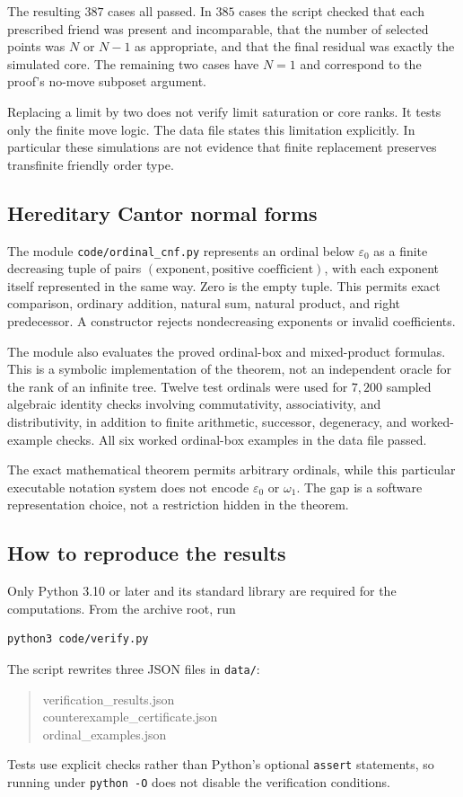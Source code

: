 \documentclass[11pt,letterpaper]{article}
\theoremstyle{definition}
\theoremstyle{remark}
\begin{document}
The resulting $387$ cases all passed. In $385$ cases the script checked
that each prescribed friend was present and incomparable, that the number
of selected points was $N$ or $N-1$ as appropriate, and that the final
residual was exactly the simulated core. The remaining two cases have
$N=1$ and correspond to the proof's no-move subposet argument.

Replacing a limit by two does not verify limit saturation or core ranks.
It tests only the finite move logic. The data file states this limitation
explicitly. In particular these simulations are not evidence that finite
replacement preserves transfinite friendly order type.

\subsection{Hereditary Cantor normal forms}
The module \texttt{code/ordinal\_cnf.py} represents an ordinal below
$\varepsilon_0$ as a finite decreasing tuple of pairs
$(\text{exponent},\text{positive coefficient})$, with each exponent itself
represented in the same way. Zero is the empty tuple. This permits exact
comparison, ordinary addition, natural sum, natural product, and right
predecessor. A constructor rejects nondecreasing exponents or invalid
coefficients.

The module also evaluates the proved ordinal-box and mixed-product
formulas. This is a symbolic implementation of the theorem, not an
independent oracle for the rank of an infinite tree. Twelve test ordinals
were used for $7{,}200$ sampled algebraic identity checks involving
commutativity, associativity, and distributivity, in addition to finite
arithmetic, successor, degeneracy, and worked-example checks. All six
worked ordinal-box examples in the data file passed.

The exact mathematical theorem permits arbitrary ordinals, while this
particular executable notation system does not encode $\varepsilon_0$ or
$\omega_1$. The gap is a software representation choice, not a restriction
hidden in the theorem.

\subsection{How to reproduce the results}
Only Python 3.10 or later and its standard library are required for the
computations. From the archive root, run
\begin{lstlisting}[language=bash]
python3 code/verify.py
\end{lstlisting}
The script rewrites three JSON files in \texttt{data/}:
\begin{quote}\small\ttfamily
verification\_results.json\\
counterexample\_certificate.json\\
ordinal\_examples.json
\end{quote}
Tests use explicit checks rather than
Python's optional \texttt{assert} statements, so running under
\texttt{python -O} does not disable the verification conditions.
\end{document}

